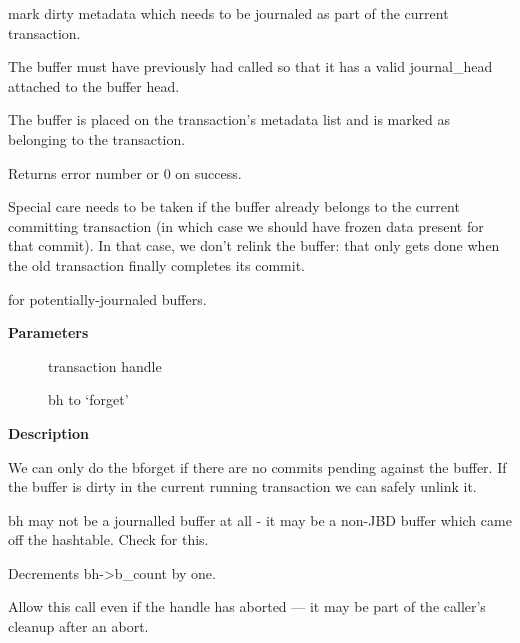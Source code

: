 \documentclass[a4paper,8pt,english]{sphinxmanual}
\begin{document}
mark dirty metadata which needs to be journaled as part of the current
transaction.

The buffer must have previously had {\hyperref[filesystems/index:c.jbd2_journal_get_write_access]{\emph{}}}
called so that it has a valid journal\_head attached to the buffer
head.

The buffer is placed on the transaction's metadata list and is marked
as belonging to the transaction.

Returns error number or 0 on success.

Special care needs to be taken if the buffer already belongs to the
current committing transaction (in which case we should have frozen
data present for that commit).  In that case, we don't relink the
buffer: that only gets done when the old transaction finally
completes its commit.

\begin{fulllineitems}
\label{filesystems/index:c.jbd2_journal_forget}
 for potentially-journaled buffers.

\end{fulllineitems}


\textbf{Parameters}
\begin{description}
\item[{}] \leavevmode
transaction handle

\item[{}] \leavevmode
bh to `forget'

\end{description}

\textbf{Description}

We can only do the bforget if there are no commits pending against the
buffer.  If the buffer is dirty in the current running transaction we
can safely unlink it.

bh may not be a journalled buffer at all - it may be a non-JBD
buffer which came off the hashtable.  Check for this.

Decrements bh-\textgreater{}b\_count by one.

Allow this call even if the handle has aborted --- it may be part of
the caller's cleanup after an abort.
\end{document}
